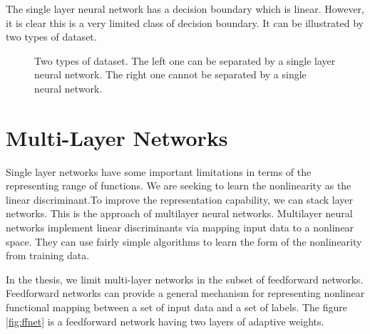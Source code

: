 The single layer neural network has a decision boundary which is linear. However, it is clear this is a very limited class of decision boundary. It can be illustrated by two types of dataset.
\graphicspath{ {./Figures/} }
\begin{figure}[!htb]
\centering     %
{}
\caption{Two types of dataset. The left one can be separated by a single layer neural network. The right one cannot be separated by a single neural network.}
\end{figure}

\section{Multi-Layer Networks}

Single layer networks have some important limitations in terms of the representing range of functions. We are seeking to learn the nonlinearity as the linear discriminant.To improve the representation capability, we can stack layer networks. This is the approach of multilayer neural networks. Multilayer neural networks implement linear discriminants via mapping input data to a nonlinear space. They can use fairly simple algorithms to learn the form of the nonlinearity from training data.

In the thesis, we limit multi-layer networks in the subset of feedforward networks. Feedforward networks can provide a general mechanism for representing nonlinear functional mapping between a set of input data and a set of labels. The figure \ref{fig:ffnet} is a feedforward network having two layers of adaptive weights.


